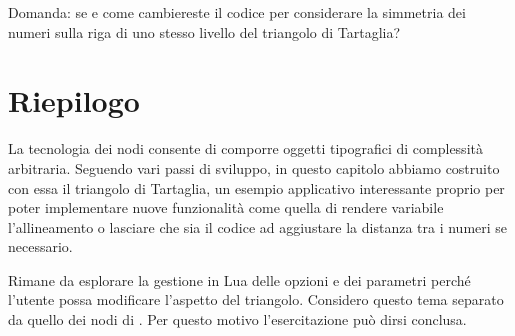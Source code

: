Domanda: se e come cambiereste il codice per considerare la simmetria dei numeri
sulla riga di uno stesso livello del triangolo di Tartaglia?


\section{Riepilogo}

La tecnologia dei nodi consente di comporre oggetti tipografici di complessità
arbitraria. Seguendo vari passi di sviluppo, in questo capitolo abbiamo
costruito con essa il triangolo di Tartaglia, un esempio applicativo
interessante proprio per poter implementare nuove funzionalità come quella di
rendere variabile l'allineamento o lasciare che sia il codice ad aggiustare la
distanza tra i numeri se necessario.

Rimane da esplorare la gestione in Lua delle opzioni e dei parametri perché
l'utente possa modificare l'aspetto del triangolo. Considero questo tema
separato da quello dei nodi di \LuaTeX{}. Per questo motivo l'esercitazione
può dirsi conclusa.


